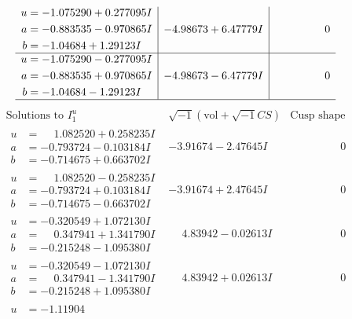 \documentclass[1p]{elsarticle_modified}
\theoremstyle{definition}
\newcommand{\I}{\sqrt{-1}}
\begin{document}
$$\begin{array}{c|c|c}
\begin{aligned}
u &= -1.075290 + 0.277095 I \\
a &= -0.883535 - 0.970865 I \\
b &= -1.04684 + 1.29123 I\end{aligned}
 & -4.98673 + 6.47779 I & \phantom{-0.000000 } 0 \\ \hline\begin{aligned}
u &= -1.075290 - 0.277095 I \\
a &= -0.883535 + 0.970865 I \\
b &= -1.04684 - 1.29123 I\end{aligned}
 & -4.98673 - 6.47779 I & \phantom{-0.000000 } 0\\
 \hline 
 \end{array}$$\newpage$$\begin{array}{c|c|c}  
\text{Solutions to }I^u_{1}& \I (\text{vol} + \sqrt{-1}CS) & \text{Cusp shape}\\
 \hline 
\begin{aligned}
u &= \phantom{-}1.082520 + 0.258235 I \\
a &= -0.793724 - 0.103184 I \\
b &= -0.714675 + 0.663702 I\end{aligned}
 & -3.91674 - 2.47645 I & \phantom{-0.000000 } 0 \\ \hline\begin{aligned}
u &= \phantom{-}1.082520 - 0.258235 I \\
a &= -0.793724 + 0.103184 I \\
b &= -0.714675 - 0.663702 I\end{aligned}
 & -3.91674 + 2.47645 I & \phantom{-0.000000 } 0 \\ \hline\begin{aligned}
u &= -0.320549 + 1.072130 I \\
a &= \phantom{-}0.347941 + 1.341790 I \\
b &= -0.215248 - 1.095380 I\end{aligned}
 & \phantom{-}4.83942 - 0.02613 I & \phantom{-0.000000 } 0 \\ \hline\begin{aligned}
u &= -0.320549 - 1.072130 I \\
a &= \phantom{-}0.347941 - 1.341790 I \\
b &= -0.215248 + 1.095380 I\end{aligned}
 & \phantom{-}4.83942 + 0.02613 I & \phantom{-0.000000 } 0 \\ \hline\begin{aligned}
u &= -1.11904\phantom{ +0.000000I} \\

\end{aligned}
\end{array}$$
\end{document}
